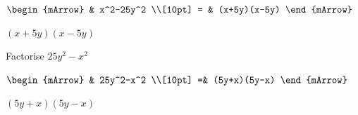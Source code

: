 \begin{mtask}[resume]
\begin{exercise}
\begin{envSolution}
			      $\begin{mArrow}
			          & x^2-25y^2                    \\[10pt]  
                      = & (x+5y)(x-5y)  					  
				 \end{mArrow}$
                 \begin{shortsolution}  
				       $(x+5y)(x-5y)$
			     \end{shortsolution}				 
               \end{envSolution}
         \end{exercise}

   \task \begin{exercise} Factorise $25y^2-x^2$\\
             \begin{envSolution}
			      
			      $\begin{mArrow}
			           & 25y^2-x^2                      \\[10pt]    
					  =& (5y+x)(5y-x) 
				 \end{mArrow}$
                 \begin{shortsolution}  
				       $(5y+x)(5y-x)$
			     \end{shortsolution}				 
               \end{envSolution}
         \end{exercise}
		 		 
\end{mtask}

\clearpage\noindent%

